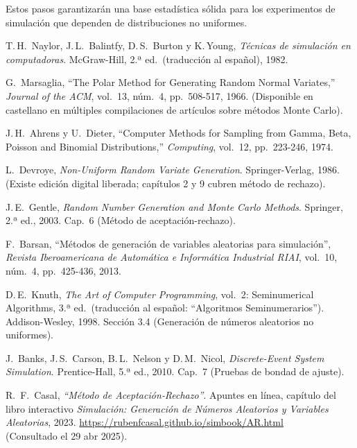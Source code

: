 \documentclass[11pt]{article}
\begin{document}
Estos pasos garantizarán una base estadística sólida para los experimentos de
simulación que dependen de distribuciones no uniformes.
\begin{thebibliography}{99}

T.\,H.~Naylor, J.\,L.~Balintfy, D.\,S.~Burton y K.\,Young,
\textit{Técnicas de simulación en computadoras}.
McGraw-Hill, 2.ª ed.\ (traducción al español), 1982.

G.~Marsaglia,
``The Polar Method for Generating Random Normal Variates,''
\textit{Journal of the ACM}, vol.\ 13, núm.\ 4, pp.\ 508-517, 1966.
(Disponible en castellano en múltiples compilaciones de artículos sobre métodos Monte Carlo).

J.\,H.~Ahrens y U.~Dieter,
``Computer Methods for Sampling from Gamma, Beta, Poisson and Binomial Distributions,''
\textit{Computing}, vol.\ 12, pp.\ 223-246, 1974.

L.~Devroye,
\textit{Non-Uniform Random Variate Generation}.
Springer-Verlag, 1986.  
(Existe edición digital liberada; capítulos 2 y 9 cubren método de rechazo).

J.\,E.~Gentle,
\textit{Random Number Generation and Monte Carlo Methods}.
Springer, 2.ª ed., 2003.  
Cap.\ 6 (Método de aceptación-rechazo).

F.~Barsan,
``Métodos de generación de variables aleatorias para simulación'',
\textit{Revista Iberoamericana de Automática e Informática Industrial RIAI},
vol.\ 10, núm.\ 4, pp.\ 425-436, 2013.

D.\,E.~Knuth,
\textit{The Art of Computer Programming}, vol.\ 2: Seminumerical Algorithms,
3.ª ed.\ (traducción al español: ``Algoritmos Seminumerarios'').
Addison-Wesley, 1998.  
Sección 3.4 (Generación de números aleatorios no uniformes).

J.~Banks, J.\,S.~Carson, B.\,L.~Nelson y D.\,M.~Nicol,
\textit{Discrete-Event System Simulation}.
Prentice-Hall, 5.ª ed., 2010.  
Cap.\ 7 (Pruebas de bondad de ajuste).

R.~F.~Casal,
\textit{“Método de Aceptación‐Rechazo”}.  
Apuntes en línea, capítulo del libro interactivo  
\emph{Simulación: Generación de Números Aleatorios y Variables Aleatorias}, 2023.  
\url{https://rubenfcasal.github.io/simbook/AR.html}  \\
(Consultado el 29 abr 2025).

\end{thebibliography}
\end{document}
